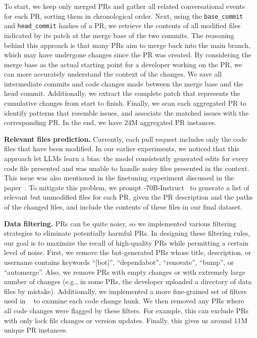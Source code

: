 To start, we keep only merged PRs and gather all related conversational events for each PR, sorting them in chronological order. Next, using the \texttt{base\_commit} and \texttt{head\_commit} hashes of a PR, we retrieve the contents of all modified files indicated by its patch at the merge base of the two commits.
The reasoning behind this approach is that many PRs aim to merge back into the main branch, which may have undergone changes since the PR was created. By considering the merge base as the actual starting point for a developer working on the PR, we can more accurately understand the context of the changes.
We save all intermediate commits and code changes made between the merge base and the head commit. Additionally, we extract the complete patch that represents the cumulative changes from start to finish.
Finally, we scan each aggregated PR to identify patterns that resemble issues, and associate the matched issues with the corresponding PR. In the end, we have 24M aggregated PR instances.

\textbf{Relevant files prediction.}
Currently, each pull request includes only the code files that have been modified. In our earlier experiments, we noticed that this approach let LLMs learn a bias: the model consistently generated edits for every code file presented and was unable to handle noisy files presented in the context. This issue was also mentioned in the finetuning experiment discussed in the \swebench{} paper~\cite{swebench}.
To mitigate this problem, we prompt -70B-Instruct~\cite{llama31} to generate a list of relevant but unmodified files for each PR, given the PR description and the paths of the changed files, and include the contents of these files in our final dataset.

\textbf{Data filtering.}
\github PRs can be quite noisy, so we implemented various filtering strategies to eliminate potentially harmful PRs. In designing these filtering rules, our goal is to maximize the recall of high-quality PRs while permitting a certain level of noise.
First, we remove the bot-generated PRs whose title, description, or username contains keywords ``[bot]'', ``dependabot'', ``renovate'', ``bump'', or ``automerge''.
Also, we remove PRs with empty changes or with extremely large number of changes (e.g., in some PRs, the developer uploaded a directory of data files by mistake).
Additionally, we implemented a more fine-grained set of filters used in \codellama~\cite{codellama} to examine each code change hunk. We then removed any PRs where all code changes were flagged by these filters. For example, this can exclude PRs with only lock file changes or version updates.
Finally, this gives us around 11M unique PR instances.


